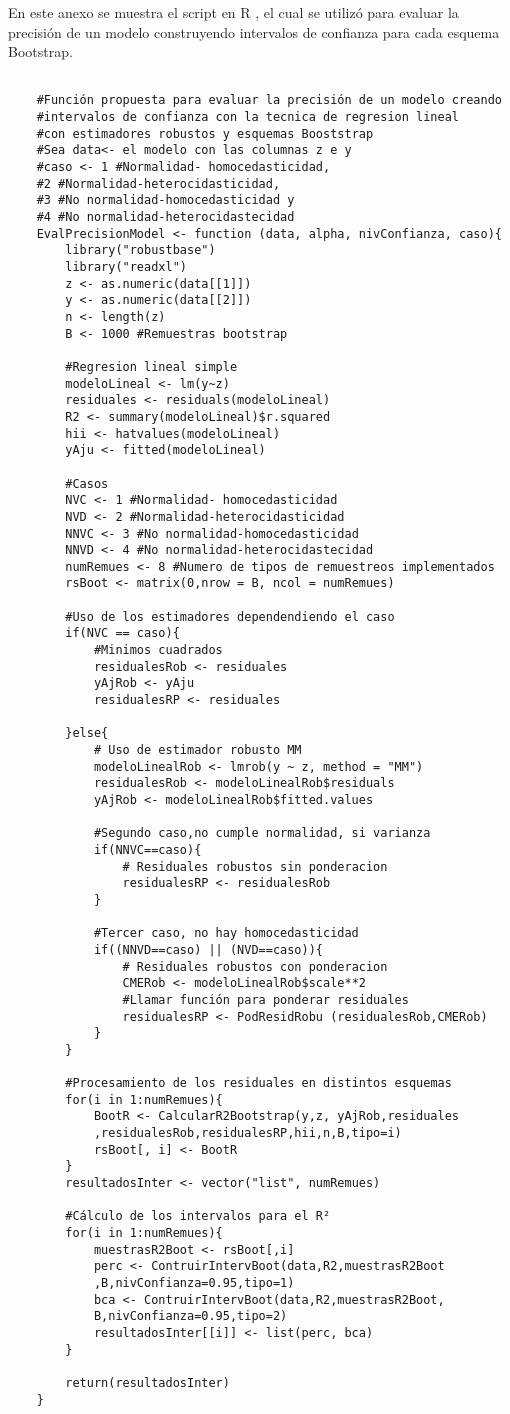 En este anexo se muestra el script en R \parencite{R-2024}, el cual se utilizó para evaluar la precisión de un modelo construyendo intervalos de confianza para cada esquema Bootstrap.\\

\begin{verbatim}
	
	#Función propuesta para evaluar la precisión de un modelo creando
	#intervalos de confianza con la tecnica de regresion lineal
	#con estimadores robustos y esquemas Booststrap
	#Sea data<- el modelo con las columnas z e y
	#caso <- 1 #Normalidad- homocedasticidad,
	#2 #Normalidad-heterocidasticidad,
	#3 #No normalidad-homocedasticidad y 
	#4 #No normalidad-heterocidastecidad 
	EvalPrecisionModel <- function (data, alpha, nivConfianza, caso){
		library("robustbase")
		library("readxl")
		z <- as.numeric(data[[1]])
		y <- as.numeric(data[[2]])
		n <- length(z)
		B <- 1000 #Remuestras bootstrap
		
		#Regresion lineal simple
		modeloLineal <- lm(y~z)
		residuales <- residuals(modeloLineal)
		R2 <- summary(modeloLineal)$r.squared
		hii <- hatvalues(modeloLineal)
		yAju <- fitted(modeloLineal)
		
		#Casos
		NVC <- 1 #Normalidad- homocedasticidad
		NVD <- 2 #Normalidad-heterocidasticidad
		NNVC <- 3 #No normalidad-homocedasticidad
		NNVD <- 4 #No normalidad-heterocidastecidad 
		numRemues <- 8 #Numero de tipos de remuestreos implementados
		rsBoot <- matrix(0,nrow = B, ncol = numRemues)
		
		#Uso de los estimadores dependendiendo el caso
		if(NVC == caso){
			#Minimos cuadrados
			residualesRob <- residuales
			yAjRob <- yAju
			residualesRP <- residuales
			
		}else{
			# Uso de estimador robusto MM  
			modeloLinealRob <- lmrob(y ~ z, method = "MM")
			residualesRob <- modeloLinealRob$residuals
			yAjRob <- modeloLinealRob$fitted.values
			
			#Segundo caso,no cumple normalidad, si varianza
			if(NNVC==caso){
				# Residuales robustos sin ponderacion
				residualesRP <- residualesRob
			}
			
			#Tercer caso, no hay homocedasticidad
			if((NNVD==caso) || (NVD==caso)){
				# Residuales robustos con ponderacion
				CMERob <- modeloLinealRob$scale**2
				#Llamar función para ponderar residuales
				residualesRP <- PodResidRobu (residualesRob,CMERob)
			}
		}
		
		#Procesamiento de los residuales en distintos esquemas
		for(i in 1:numRemues){
			BootR <- CalcularR2Bootstrap(y,z, yAjRob,residuales
			,residualesRob,residualesRP,hii,n,B,tipo=i)
			rsBoot[, i] <- BootR
		}
		resultadosInter <- vector("list", numRemues)
		
		#Cálculo de los intervalos para el R²
		for(i in 1:numRemues){
			muestrasR2Boot <- rsBoot[,i]
			perc <- ContruirIntervBoot(data,R2,muestrasR2Boot
			,B,nivConfianza=0.95,tipo=1)
			bca <- ContruirIntervBoot(data,R2,muestrasR2Boot,
			B,nivConfianza=0.95,tipo=2)
			resultadosInter[[i]] <- list(perc, bca)
		}
		
		return(resultadosInter)
	}
\end{verbatim}

